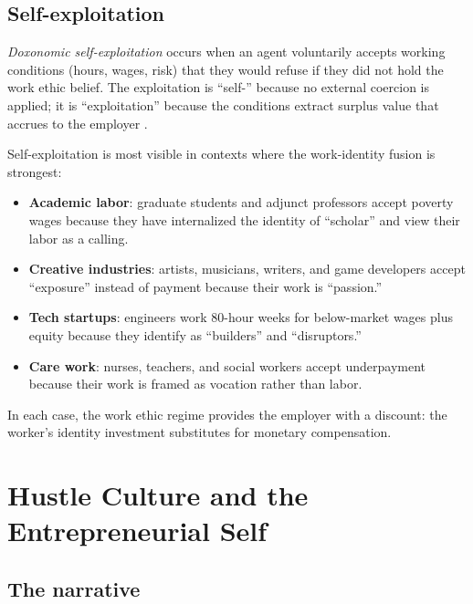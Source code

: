 \subsection{Self-exploitation}

\begin{definition}
\label{def:self-exploitation}
\emph{Doxonomic self-exploitation} occurs when an agent voluntarily accepts working conditions (hours, wages, risk) that they would refuse if they did not hold the work ethic belief.
The exploitation is ``self-'' because no external coercion is applied; it is ``exploitation'' because the conditions extract surplus value that accrues to the employer \autocite{brown2015}.
\end{definition}

Self-exploitation is most visible in contexts where the work-identity fusion is strongest:
\begin{itemize}[nosep]
  \item \textbf{Academic labor}: graduate students and adjunct professors accept poverty wages because they have internalized the identity of ``scholar'' and view their labor as a calling.
  \item \textbf{Creative industries}: artists, musicians, writers, and game developers accept ``exposure'' instead of payment because their work is ``passion.''
  \item \textbf{Tech startups}: engineers work 80-hour weeks for below-market wages plus equity because they identify as ``builders'' and ``disruptors.''
  \item \textbf{Care work}: nurses, teachers, and social workers accept underpayment because their work is framed as vocation rather than labor.
\end{itemize}

In each case, the work ethic regime provides the employer with a discount: the worker's identity investment substitutes for monetary compensation.

\section{Hustle Culture and the Entrepreneurial Self}
\label{sec:ch26-hustle}

\subsection{The narrative}

